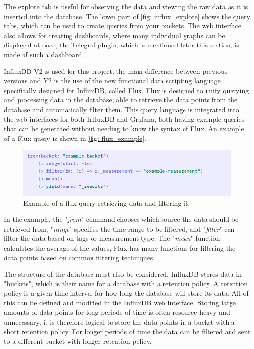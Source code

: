 \documentclass[main.tex]{subfiles}
\begin{document}
The explore tab is useful for observing the data and viewing the raw data as it is inserted into the database. The lower part of \autoref{fig: influx_explore} shows the query tabs, which can be used to create queries from your buckets. The web interface also allows for creating dashboards, where many individual graphs can be displayed at once, the Telegraf plugin, which is mentioned later this section, is made of such a dashboard.

InfluxDB V2 is used for this project, the main difference between previous versions and V2 is the use of the new functional data scripting language specifically designed for InfluxDB, called Flux. Flux is designed to unify querying and processing data in the database, able to retrieve the data points from the database and automatically filter them. This query language is integrated into the web interfaces for both InfluxDB and Grafana, both having example queries that can be generated without needing to know the syntax of Flux. An example of a Flux query is shown in \autoref{fig: flux_example}.

\begin{figure}[!htpb]
    \centering
    \includegraphics[width=17cm, scale=4]{images/flux_example.png}
    \caption{Example of a flux query retrieving data and filtering it.}
    \label{fig: flux_example}
\end{figure}
\FloatBarrier

In the example, the "\textit{from}" command chooses which source the data should be retrieved from, "\textit{range}" specifies the time range to be filtered, and "\textit{filter}" can filter the data based on tags or measurement type. The "\textit{mean}" function calculates the average of the values, Flux has many functions for filtering the data points based on common filtering techniques.


The structure of the database must also be considered. InfluxDB stores data in "buckets", which is their name for a database with a retention policy. A retention policy is a given time interval for how long the database will store its data. All of this can be defined and modified in the InfluxDB web interface. Storing large amounts of data points for long periods of time is often resource heavy and unnecessary, it is therefore logical to store the data points in a bucket with a short retention policy. For longer periods of time the data can be filtered and sent to a different bucket with longer retention policy.
\end{document}
